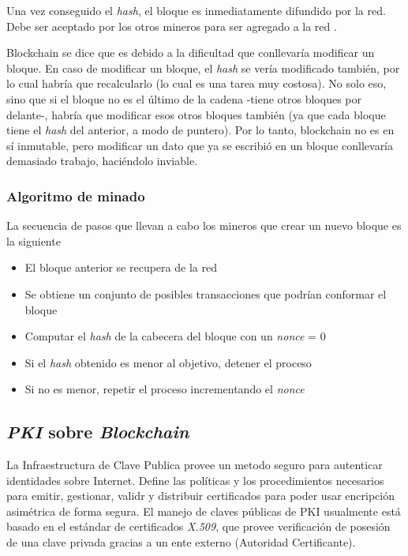 Una vez conseguido el \emph{hash}, el bloque es inmediatamente difundido por la red. Debe ser aceptado por los otros mineros para ser agregado a la red \autocite{MasteringBlockchainProofOfWork}. 

Blockchain se dice que es  debido a la dificultad que conllevaría modificar un bloque. En caso de modificar un bloque, el \emph{hash} se vería modificado también, por lo cual habría que recalcularlo (lo cual es una tarea muy costosa). No solo eso, sino que si el bloque no es el último de la cadena -tiene otros bloques por delante-, habría que modificar esos otros bloques también (ya que cada bloque tiene el \emph{hash} del anterior, a modo de puntero). Por lo tanto, blockchain no es en sí inmutable, pero modificar un dato que ya se escribió en un bloque conllevaría demasiado trabajo, haciéndolo inviable.

\subsubsection*{Algoritmo de minado}

La secuencia de pasos que llevan a cabo los mineros que crear un nuevo bloque es la siguiente \autocite{MasteringBlockchainMiningAlgorithm}

\begin{itemize}
    \item El bloque anterior se recupera de la red
    \item Se obtiene un conjunto de posibles transacciones que podrían conformar el bloque
    \item Computar el \emph{hash} de la cabecera del bloque con un \emph{nonce} = 0 
    \item Si el \emph{hash} obtenido es menor al objetivo, detener el proceso
    \item Si no es menor, repetir el proceso incrementando el \emph{nonce} 
\end{itemize}

\subsection{\emph{PKI} sobre \emph{Blockchain}}

La Infraestructura de Clave Publica provee un metodo seguro para autenticar identidades sobre Internet. Define las políticas y los procedimientos necesarios para emitir, gestionar, validr y distribuir certificados para poder usar encripción asimétrica de forma segura. El manejo de claves públicas de PKI usualmente está basado en el estándar de certificados \emph{X.509}, que provee verificación de posesión de una clave privada gracias a un ente externo (Autoridad Certificante).

